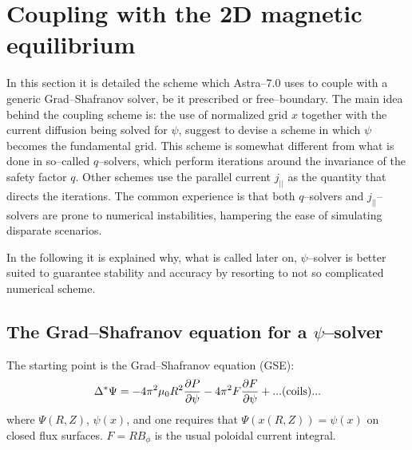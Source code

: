 
\section{Coupling with the 2D magnetic equilibrium}
In this section it is detailed the scheme which Astra--7.0 uses to couple with a
generic Grad--Shafranov solver, be it prescribed or free--boundary.
The main idea behind the coupling scheme is: the use of normalized grid $x$
together with the current diffusion being solved for $\psi$, suggest to devise a
scheme in which $\psi$ becomes the fundamental grid. This scheme is somewhat 
different from what is done in so--called $q$--solvers, which perform iterations
around the invariance of the safety factor $q$. Other schemes use the parallel 
current $j_{||}$ as the quantity that directs the iterations. 
The common experience is that both $q$--solvers and $j_{||}$--solvers are prone
to numerical instabilities, hampering the ease of simulating disparate
scenarios.

In the following it is explained why, what is called later on, $\psi$--solver is
better suited to guarantee stability and accuracy by resorting to not so 
complicated numerical scheme.
%
\subsection{The Grad--Shafranov equation for a $\psi$--solver} 
The starting point is the Grad--Shafranov equation (GSE):
\begin{eqnarray}
\Delta^* \Psi = -4\pi^2 \mu_0 R^2 \frac{\partial P}{\partial\psi} - 4\pi^2 F  \frac{\partial F}{\partial\psi} + ...{\rm (coils)}...
\label{GSeqcouplsec}
\end{eqnarray}
where $\Psi(R,Z)$, $\psi(x)$, and one requires that $\Psi(x(R,Z))=\psi(x)$ on closed flux surfaces.
$F=R B_\phi$ is the usual poloidal current integral.

